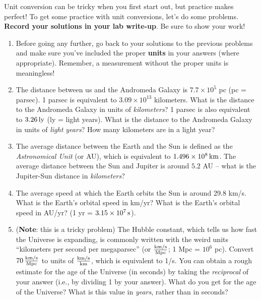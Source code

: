 \documentclass[11pt]{article}
\begin{document}
Unit conversion can be tricky when you first start out, but practice makes perfect! To get some practice with unit conversions, let's do some problems. \textbf{Record your solutions in your lab write-up}. Be sure to show your work!
\begin{enumerate}
    \item Before going any further, go back to your solutions to the previous problems and make sure you've included the proper \textbf{units} in your answers (where appropriate). Remember, a measurement without the proper units is meaningless!
    
    \item The distance between us and the Andromeda Galaxy is $7.7 \times 10^5$ pc (pc = parsec). 1 parsec is equivalent to $3.09 \times 10^{13}$ kilometers. What is the distance to the Andromeda Galaxy in units of \emph{kilometers}? 1 parsec is also equivalent to $3.26 \, {\rm ly}$ (ly = light years). What is the distance to the Andromeda Galaxy in units of \emph{light years}? How many kilometers are in a light year? 
    
    \item The average distance between the Earth and the Sun is defined as the \emph{Astronomical Unit} (or AU), which is equivalent to $1.496 \times 10^8 \, {\rm km}$. The average distance between the Sun and Jupiter is around $5.2$ AU -- what is the Jupiter-Sun distance in \emph{kilometers}?   
    
    \item The average speed at which the Earth orbits the Sun is around 29.8 km/s. What is the Earth's orbital speed in km/yr? What is the Earth's orbital speed in AU/yr? (1 yr = $3.15 \times 10^7 \, {\rm s}$).
    
    \item (\textbf{Note}: this is a tricky problem) The Hubble constant, which tells us how fast the Universe is expanding, is commonly written with the weird units ``kilometers per second per megaparsec'' (or $\frac{\rm km/s}{\rm Mpc}$; 1 Mpc = $10^6$ pc). Convert $70 \, \frac{\rm km/s}{\rm Mpc}$ to units of $\frac{\rm km/s}{\rm km}$, which is equivalent to 1/s. You can obtain a rough estimate for the age of the Universe (in seconds) by taking the \emph{reciprocal} of your answer (i.e., by dividing 1 by your answer). What do you get for the age of the Universe? What is this value in \emph{years}, rather than in seconds?  
\end{enumerate}
\bigskip


\end{document}
